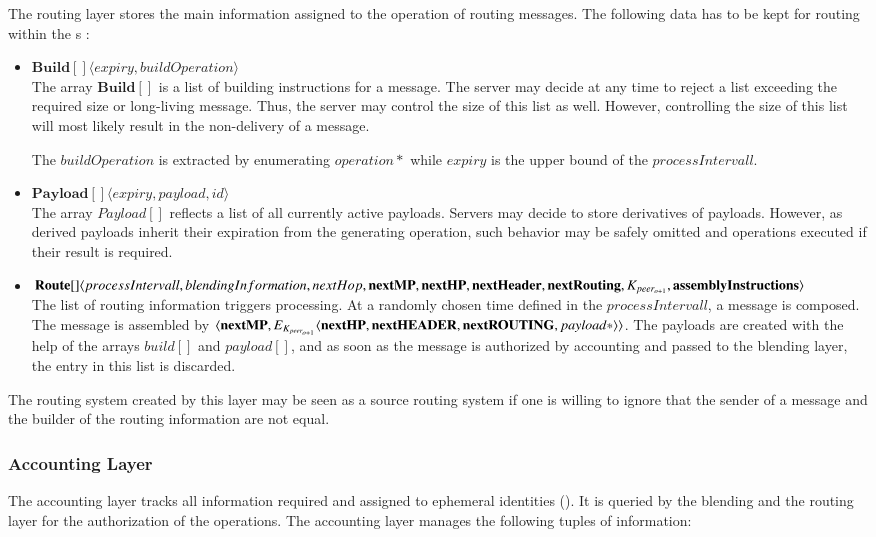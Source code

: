 The routing layer stores the main information assigned to the operation of routing messages. The following data has to be kept for routing within the s :
\begin{itemize}
	\item $\mathbf{Build[]}\langle expiry, buildOperation \rangle$\\
	The array $\mathbf{Build[]}$ is a list of building instructions for a message. The server may decide at any time to reject a list exceeding the required size or long-living message. Thus, the server may control the size of this list as well. However, controlling the size of this list will most likely result in the non-delivery of a message. 
	
	The $buildOperation$ is extracted by enumerating $operation*$ while $expiry$ is the upper bound of the $processIntervall$.
	\item $\mathbf{Payload[]}\langle expiry, payload, id \rangle$\\
	The array $Payload[]$ reflects a list of all currently active payloads. Servers may decide to store derivatives of payloads. However, as derived payloads inherit their expiration from the generating operation, such behavior may be safely omitted and operations executed if their result is required.
	
	\item $\splitatcommas{\mathbf{Route[]}\langle processIntervall, blendingInformation, nextHop, \mathbf{nextMP}, \mathbf {nextHP}, \mathbf{nextHeader}, \mathbf{nextRouting}, K_{peer_{o+1}}, \mathbf{assemblyInstructions} \rangle}$\\
	The list of routing information triggers processing. At a randomly chosen time defined in the $processIntervall$, a message is composed. The message is assembled by $\splitatcommas{\langle \mathbf{nextMP}, E_{K_{peer_{o+1}}}\langle \mathbf{nextHP}, \mathbf{nextHEADER}, \mathbf{nextROUTING}, payload* \rangle \rangle}$. The payloads are created with the help of the arrays $build[]$ and $payload[]$, and as soon as the message is authorized by accounting and passed to the blending layer, the entry in this list is discarded.
\end{itemize}

The routing system created by this layer may be seen as a source routing system if one is willing to ignore that the sender of a message and the builder of the routing information are not equal.

\subsubsection{Accounting Layer}\label{sec:accountingLayer}
The accounting layer tracks all information required and assigned to ephemeral identities (). It is queried by the blending and the routing layer for the authorization of the operations. The accounting layer manages the following tuples of information:

